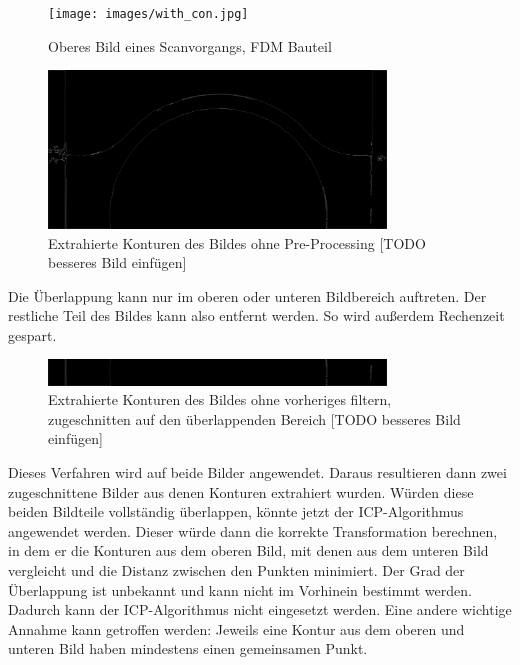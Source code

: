 \begin{figure}[h]
    \centering
    \texttt{[image: images/with\_con.jpg]} %
    \caption{Oberes Bild eines Scanvorgangs, FDM Bauteil}
    \label{fig:image_top}
\end{figure}

\begin{figure}[h]
    \centering
    \includegraphics[width=0.8\textwidth]{images/only_con.jpg} %
    \caption{Extrahierte Konturen des Bildes ohne Pre-Processing [TODO besseres Bild einfügen]}
    \label{fig:cons}
\end{figure}

Die Überlappung kann nur im oberen oder unteren Bildbereich auftreten. Der restliche 
Teil des Bildes kann also entfernt werden. So wird außerdem Rechenzeit gespart.

\begin{figure}[h]
    \centering
    \includegraphics[width=0.8\textwidth]{images/only_con_cut.jpg} %
    \caption{Extrahierte Konturen des Bildes ohne vorheriges filtern, zugeschnitten 
    auf den überlappenden Bereich [TODO besseres Bild einfügen]}
    \label{fig:cons_cut}
\end{figure}

Dieses Verfahren wird auf beide Bilder angewendet. Daraus resultieren dann zwei 
zugeschnittene Bilder aus denen Konturen extrahiert wurden. 
Würden diese beiden Bildteile vollständig überlappen, könnte jetzt der ICP-Algorithmus
angewendet werden. Dieser würde dann die korrekte Transformation berechnen, in dem er 
die Konturen aus dem oberen Bild, mit denen aus dem unteren Bild vergleicht und die 
Distanz zwischen den Punkten minimiert. 
Der Grad der Überlappung ist unbekannt und kann nicht im Vorhinein bestimmt werden.
Dadurch kann der ICP-Algorithmus nicht eingesetzt werden. 
Eine andere wichtige Annahme kann getroffen werden: Jeweils eine Kontur aus 
dem oberen und unteren Bild haben mindestens einen gemeinsamen Punkt.

